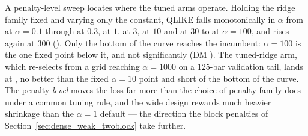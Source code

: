A penalty-level sweep locates where the tuned arms operate. Holding the
ridge family fixed and varying only the constant, QLIKE falls
monotonically in $\alpha$ from \unifBOneRidgeApOneQLIKE{} at
$\alpha = 0.1$ through \unifBOneRidgeApThreeQLIKE{} at $0.3$,
\unifBOneRidgeQLIKE{} at $1$, \unifBOneRidgeAthreeQLIKE{} at $3$,
\unifBOneRidgeAtenQLIKE{} at $10$ and \unifBOneRidgeAthirtyQLIKE{} at
$30$ to \unifBOneRidgeAhundredQLIKE{} at $\alpha = 100$, and rises again
at $300$ (\unifBOneRidgeAthreehundredQLIKE{}). Only the bottom of the
curve reaches the incumbent: $\alpha = 100$ is the one fixed point below
it, and not significantly (DM \unifBOneRidgeAhundredDM{}). The tuned-ridge
arm, which re-selects from a grid reaching $\alpha = 1000$ on a $125$-bar
validation tail, lands at \unifBOneRidgeTunedFineQLIKE{}, no better than
the fixed $\alpha = 10$ point and short of the bottom of the curve. The
penalty \emph{level} moves the loss far more than the choice of penalty
family does under a common tuning rule, and the wide design rewards
much heavier shrinkage than the $\alpha = 1$ default --- the direction the
block penalties of Section~\ref{sec:dense_weak_twoblock} take further.

